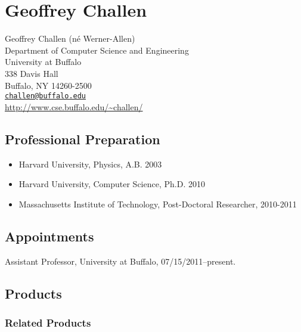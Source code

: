 \renewcommand{\thesection}{\Alph{section}}
\renewcommand{\thesubsection}{\roman{subsection}}

\chapter{Geoffrey Challen}

Geoffrey Challen (n\'{e} Werner-Allen)\\
Department of Computer Science and Engineering\\
University at Buffalo\\
338 Davis Hall\\
Buffalo, NY 14260-2500\\
\href{mailto:challen@buffalo.edu}{\texttt{challen@buffalo.edu}}\\
\url{http://www.cse.buffalo.edu/~challen/}

\section{Professional Preparation}

\begin{itemize}
\item Harvard University, Physics, A.B. 2003
\item Harvard University, Computer Science, Ph.D. 2010
\item Massachusetts Institute of Technology, Post-Doctoral Researcher, 2010-2011
\end{itemize}

\section{Appointments}

Assistant Professor, University at Buffalo, 07/15/2011--present.

\section{Products}

\subsection{Related Products}

